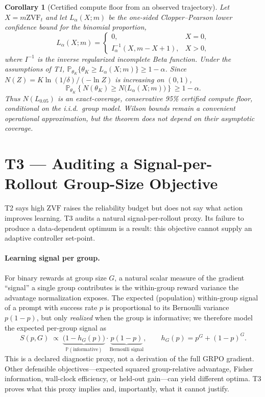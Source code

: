 \documentclass[11pt]{article}
\theoremstyle{plain}
\newtheorem{corollary}{Corollary}
\theoremstyle{definition}
\theoremstyle{remark}
\newcommand{\ZVF}{\ensuremath{\mathrm{ZVF}}}
\newcommand{\Prob}{\mathbb{P}}
\newcommand{\1}{\mathbb{1}}
\begin{document}
\begin{corollary}[Certified compute floor from an observed trajectory]
\label{cor:T2-traj}
Let $X=m\ZVF_t$ and let $L_\alpha(X;m)$ be the one-sided
Clopper--Pearson lower confidence bound for the binomial proportion,
\[
L_\alpha(X;m)=
\begin{cases}
0, & X=0,\\
I^{-1}_{\alpha}(X,m-X+1), & X>0,
\end{cases}
\]
where $I^{-1}$ is the inverse regularized incomplete Beta function. Under the
assumptions of T1,
$\Prob_{\theta_K}\{\theta_K\ge L_\alpha(X;m)\}\ge1-\alpha$. Since
$N(Z)=K\ln(1/\delta)/(-\ln Z)$ is increasing on $(0,1)$,
\[
\Prob_{\theta_K}\!\left\{N(\theta_K)\ge
N\big(L_\alpha(X;m)\big)\right\}\ge1-\alpha.
\]
Thus $N(L_{0.05})$ is an exact-coverage, conservative 95\% certified compute
floor, conditional on the i.i.d.\ group model. Wilson bounds remain a convenient
operational approximation, but the theorem does not depend on their asymptotic
coverage.
\end{corollary}

\section{T3 --- Auditing a Signal-per-Rollout Group-Size Objective}\label{sec:T3}
T2 says high \ZVF{} raises the reliability budget but does not say what action
improves learning. T3 audits a natural signal-per-rollout proxy. Its failure to
produce a data-dependent optimum is a result: this objective cannot supply an
adaptive controller set-point.

\paragraph{Learning signal per group.} For binary rewards at group size $G$,
a natural scalar measure of the gradient ``signal'' a single group contributes
is the within-group reward variance the advantage normalization exposes. The
expected (population) within-group signal of a prompt with success rate $p$ is
proportional to its Bernoulli variance $p(1-p)$, but only \emph{realized} when
the group is informative; we therefore model the expected per-group signal as
\begin{equation}\label{eq:signal-per-group}
S(p,G) \;\propto\; \underbrace{\big(1-h_G(p)\big)}_{\Prob(\text{informative})}
\cdot \underbrace{p(1-p)}_{\text{Bernoulli signal}} ,
\qquad h_G(p)=p^G+(1-p)^G .
\end{equation}
This is a declared diagnostic proxy, not a derivation of the full GRPO gradient.
Other defensible objectives---expected squared group-relative advantage, Fisher
information, wall-clock efficiency, or held-out gain---can yield different
optima. T3 proves what this proxy implies and, importantly, what it cannot
justify.
\end{document}
